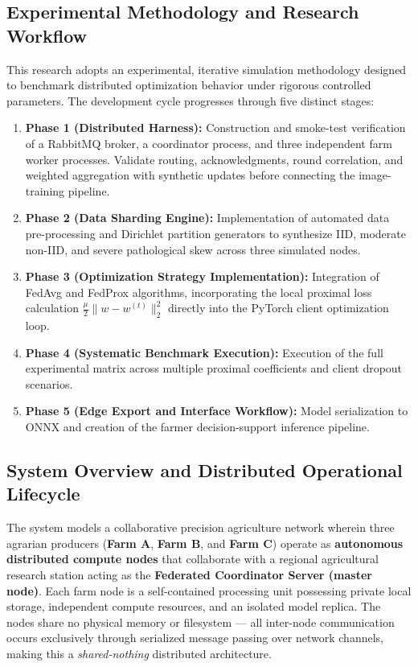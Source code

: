 \documentclass[applsci,article,submit,oneauthor,pdftex]{Definitions/mdpi}
\begin{document}
\subsection{Experimental Methodology and Research Workflow}
This research adopts an experimental, iterative simulation methodology designed to benchmark distributed optimization behavior under rigorous controlled parameters. The development cycle progresses through five distinct stages:
\begin{enumerate}[leftmargin=*]
    \item \textbf{Phase 1 (Distributed Harness):} Construction and smoke-test verification of a RabbitMQ broker, a coordinator process, and three independent farm worker processes. Validate routing, acknowledgments, round correlation, and weighted aggregation with synthetic updates before connecting the image-training pipeline.
    \item \textbf{Phase 2 (Data Sharding Engine):} Implementation of automated data pre-processing and Dirichlet partition generators to synthesize IID, moderate non-IID, and severe pathological skew across three simulated nodes.
    \item \textbf{Phase 3 (Optimization Strategy Implementation):} Integration of FedAvg and FedProx algorithms, incorporating the local proximal loss calculation $\frac{\mu}{2}\|w - w^{(t)}\|_2^2$ directly into the PyTorch client optimization loop.
    \item \textbf{Phase 4 (Systematic Benchmark Execution):} Execution of the full experimental matrix across multiple proximal coefficients and client dropout scenarios.
    \item \textbf{Phase 5 (Edge Export and Interface Workflow):} Model serialization to ONNX and creation of the farmer decision-support inference pipeline.
\end{enumerate}

\subsection{System Overview and Distributed Operational Lifecycle}
The system models a collaborative precision agriculture network wherein three agrarian producers (\textbf{Farm A}, \textbf{Farm B}, and \textbf{Farm C}) operate as \textbf{autonomous distributed compute nodes} that collaborate with a regional agricultural research station acting as the \textbf{Federated Coordinator Server (master node)}. Each farm node is a self-contained processing unit possessing private local storage, independent compute resources, and an isolated model replica. The nodes share no physical memory or filesystem --- all inter-node communication occurs exclusively through serialized message passing over network channels, making this a \textit{shared-nothing} distributed architecture.
\end{document}
